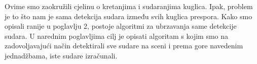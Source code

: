 Ovime smo zaokružili cjelinu o kretanjima i sudaranjima kuglica. Ipak, problem je to što nam je sama detekcija sudara između svih kuglica prespora. Kako smo opisali ranije u poglavlju 2, postoje algoritmi za ubrzavanja same detekcije sudara. U narednim poglavljima cilj je opisati algoritam s kojim smo na zadovoljavajući način detektirali sve sudare na sceni i prema gore navedenim jednadžbama, iste sudare izračunali.

